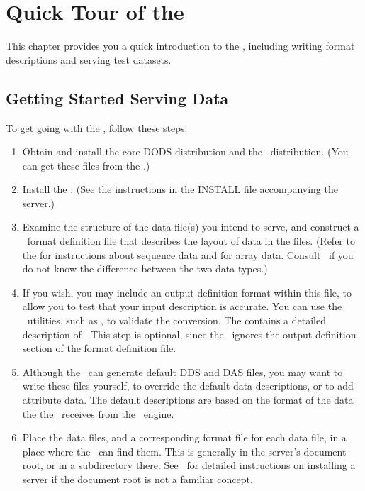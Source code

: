 %
%

\chapter{Quick Tour of the \ffs}
\label{ff,dquick}

This chapter provides you a quick introduction to the \ffs , including
writing format descriptions and serving test datasets.

\section{Getting Started Serving Data}
\label{ff,startup}

To get going with the \ffs , follow these steps:

\begin{enumerate}
\item Obtain and install the core DODS distribution and the \ffs\
  distribution.  (You can get these files from the \DODShome .)
  
\item Install the \ffs . (See the instructions in the INSTALL file
  accompanying the server.)  

\item Examine the structure of the data file(s) you intend to serve,
  and construct a \ffnd\ format definition file that describes the
  layout of data in the files.  (Refer to the 
  for instructions about sequence data and \chapterref{ff,arrayfmt}
  for array data.  Consult \DODSuser\ if you do not know the
  difference between the two data types.)
  
\item If you wish, you may include an output definition format within
  this file, to allow you to test that your input description is
  accurate.  You can use the \ffnd\ utilities, such as ,
  to validate the conversion.  The \chapterref{ff,fmtconv} contains a
  detailed description of \lit{newform}.  This step is optional, since
  the \ffs\ ignores the output definition section of the format
  definition file.

\item Although the \ffs\ can generate default DDS and DAS files, you
  may want to write these files yourself, to override the default data
  descriptions, or to add attribute data.  The default descriptions
  are based on the format of the data the the \ffs\ receives from the
  \ffnd\ engine.

\item Place the data files, and a corresponding format file for each
  data file, in a place where the \ffs\ can find them.  This is
  generally in the server's document root, or in a subdirectory
  there.  See \DODSuser\ for detailed instructions on installing a
  server if the document root is not a familiar concept.

\end{enumerate}

